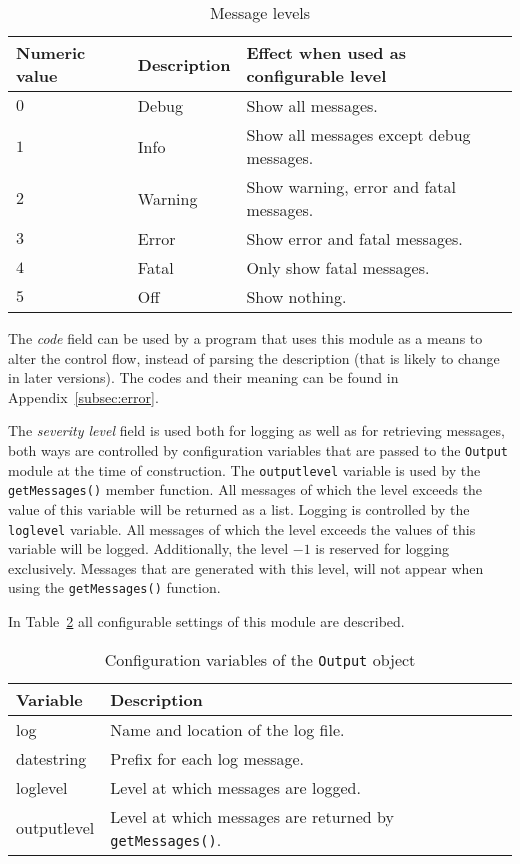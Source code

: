 \documentclass{article}
\begin{document}
\begin{table}[H]
\begin{center}
\begin{tabular}{l|l|l}
Numeric value & Description & Effect when used as configurable level \\
\hline
$0$           & Debug   & Show all messages. \\
$1$           & Info    & Show all messages except debug messages. \\
$2$           & Warning & Show warning, error and fatal messages. \\
$3$           & Error   & Show error and fatal messages. \\
$4$           & Fatal   & Only show fatal messages. \\
$5$           & Off     & Show nothing. \\
\end{tabular}
\caption{Message levels} \label{tab:messagelevel}
\end{center}
\end{table}

The \emph{code} field can be used by a program that uses this module as a means to alter the control flow, instead of parsing the description (that is likely
to change in later versions). The codes and their meaning can be found in
Appendix~\ref{subsec:error}.

The \emph{severity level} field is used both for logging as well as for
retrieving messages, both ways are controlled by configuration variables that
are passed to the \texttt{Output} module at the time of construction.
The \texttt{outputlevel} variable is used by the \texttt{getMessages()} member
function. All messages of which the level exceeds the value of this variable
will be returned as a list. Logging is controlled by the \texttt{loglevel}
variable. All messages of which the level exceeds the values of this variable
will be logged. Additionally, the level $-1$ is reserved for logging
exclusively. Messages that are generated with this level, will not appear when
using the \texttt{getMessages()} function.

In Table~\ref{tab:outputconfig} all configurable settings of this module are
described.

\begin{table}[H]
\begin{center}
\begin{tabular}{l|l}
Variable    & Description \\
\hline
log         & Name and location of the log file. \\
datestring  & Prefix for each log message. \\
loglevel    & Level at which messages are logged. \\
outputlevel & Level at which messages are returned by \texttt{getMessages()}.
\end{tabular}
\caption{Configuration variables of the \texttt{Output} object}
\label{tab:outputconfig}
\end{center}
\end{table}
\end{document}
